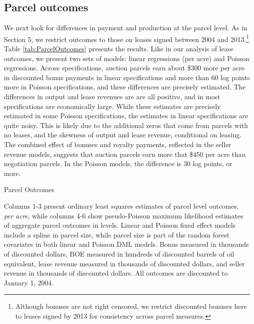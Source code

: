 \subsection{Parcel outcomes \label{sec:ParcelOutcomes}}
We next look for differences in payment and production at the parcel level. As in Section 5, we restrict outcomes to those on leases signed between 2004 and 2013.\footnote{Although bonuses are not right censored, we restrict discounted bonuses here to leases signed by 2013 for consistency across parcel measures.} Table \ref{tab:ParcelOutcomes} presents the results. Like in our analysis of lease outcomes, we present two sets of models: linear regressions (per acre) and Poisson regressions. Across specifications, auction parcels earn about \$300 more per acre in discounted bonus payments in linear specifications and more than 60 log points more in Poisson specifications, and these differences are precisely estimated.  The differences in output and lease revenues are are all positive, and in most specifications are economically large.  While these estimates are precisely estimated in some Poisson specifications, the estimates in linear specifications are quite noisy. This is likely due to the additional zeros that come from parcels with no leases, and the skewness of output and lease revenue, conditional on leasing.  The combined effect of bonuses and royalty payments, reflected in the seller revenue models, suggests that auction parcels earn more that \$450 per acre than negotiation parcels.  In the Poisson models, the difference is 30 log points, or more. 

\begin{table}[htpb]
\begin{center}
\begin{threeparttable}
	\caption{Parcel Outcomes}
	\label{tab:ParcelOutcomes}
 	\small
   	            
    \footnotesize
    \begin{tablenotes}
    	\item Columns 1-3 present ordinary least squares estimates of parcel level outcomes, \textit{per acre}, while columns 4-6 show pseudo-Poisson maximum likelihood estimates of aggregate parcel outcomes in levels.  Linear and Poisson fixed effect models include a spline in parcel size, while parcel size is part of the random forest covariates in both linear and Poisson DML models.  Bonus measured in thousands of discounted dollars, BOE measured in hundreds of discounted barrels of oil equivalent, lease revenue measured in thousands of discounted dollars, and seller revenue in thousands of discounted dollars.  All outcomes are discounted to January 1, 2004.
    \end{tablenotes}
\end{threeparttable}
\end{center}
\end{table}

